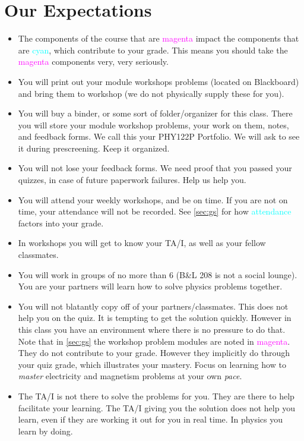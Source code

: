 \documentclass[12pt]{article}
\begin{document}
\section{Our Expectations} \label{sec:oe}

\begin{itemize}
	\item The components of the course that are \textcolor{magenta}{magenta} impact the components that are \textcolor{cyan}{cyan}, which contribute to your grade. This means you should take the \textcolor{magenta}{magenta} components very, very seriously.
	\item You will print out your module workshops problems (located on Blackboard) and bring them to workshop (we do not physically supply these for you).
	\item You will buy a binder, or some sort of folder/organizer for this class. There you will store your module workshop problems, your work on them, notes, and feedback forms. We call this your PHY122P Portfolio. We will ask to see it during prescreening. Keep it organized.
	\item You will not lose your feedback forms. We need proof that you passed your quizzes, in case of future paperwork failures. Help us help you.
	\item You will attend your weekly workshops, and be on time. If you are not on time, your attendance will not be recorded. See \ref{sec:gs} for how \textcolor{cyan}{attendance} factors into your grade.
	\item In workshops you will get to know your TA/I, as well as your fellow classmates.
	\item You will work in groups of no more than 6 (B\&L 208 is not a social lounge). You are your partners will learn how to solve physics problems together. 
	\item You will not blatantly copy off of your partners/classmates. This does not help you on the quiz. It is tempting to get the solution quickly. However in this class you have an environment where there is no pressure to do that. Note that in \ref{sec:gs} the workshop problem modules are noted in \textcolor{magenta}{magenta}. They do not contribute to your grade. However they implicitly do through your quiz grade, which illustrates your mastery. Focus on learning how to \emph{master} electricity and magnetism problems at your own \emph{pace}.
	\item The TA/I is not there to solve the problems for you. They are there to help facilitate your learning. The TA/I giving you the solution does not help you learn, even if they are working it out for you in real time. In physics you learn by doing.

\end{itemize}
\end{document}
